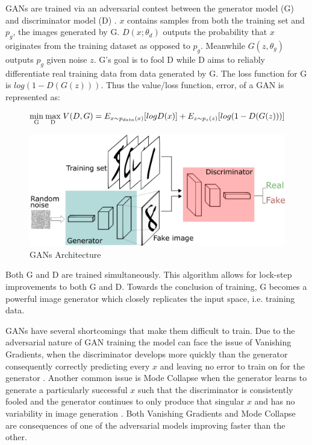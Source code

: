 \documentclass[%
 reprint,
 amsmath,amssymb,
 aps,
]{revtex4-2}
\begin{document}
GANs are trained via an adversarial contest between the generator model (G) and discriminator model (D) \cite{goodfellow2014generative}. $x$ contains samples from both the training set and $p_g$, the images generated by G. $D(x;\theta_d)$ outputs the probability that $x$ originates from the training dataset as opposed to $p_g$. Meanwhile $G(z, \theta_g)$ outputs $p_g$ given noise $z$. G's goal is to fool D while D aims to reliably differentiate real training data from data generated by G. The loss function for G is $log(1 - D(G(z)))$. Thus the value/loss function, error, of a GAN is represented as:
\begin{widetext}
\begin{equation}
\mathrm{\underset{G}{min} \:\underset{D}{max} } \;V (D, G) = E_{x\sim p_{data}(x)} [log D(x)] \\
+ E_{z\sim p_{z}(z)} [log(1 - D(G(z)))]
\end{equation}
\end{widetext}

\begin{figure}[h]
    \includegraphics[width=0.9\columnwidth]{GANs.png}
    \caption{\label{fig:GAN} GANs Architecture \cite{pathmind}}
\end{figure}



Both G and D are trained simultaneously. This algorithm allows for lock-step improvements to both G and D. Towards the conclusion of training, G becomes a powerful image generator which closely replicates the input space, i.e. training data.


GANs have several shortcomings that make them difficult to train. Due to the adversarial nature of GAN training the model can face the issue of Vanishing Gradients, when the discriminator develops more quickly than the generator consequently correctly predicting every $x$ and leaving no error to train on for the generator \cite{google}. Another common issue is Mode Collapse when the generator learns to generate a particularly successful $x$ such that the discriminator is consistently fooled and the generator continues to only produce that singular $x$ and has no variability in image generation \cite{google}. Both Vanishing Gradients and Mode Collapse are consequences of one of the adversarial models improving faster than the other.
\end{document}

